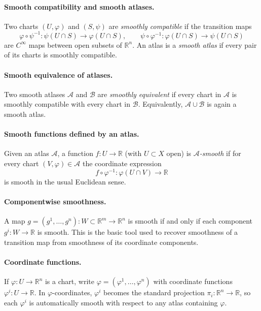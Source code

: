 \documentclass[12pt,a4paper]{article}
\theoremstyle{plain}
\theoremstyle{definition}      %
\begin{document}
\paragraph{Smooth compatibility and smooth atlases.}
Two charts $(U,\varphi)$ and $(S,\psi)$ are \emph{smoothly compatible} if the transition maps
\[
\varphi\circ \psi^{-1}:\psi(U\cap S)\to \varphi(U\cap S),
\qquad
\psi\circ \varphi^{-1}:\varphi(U\cap S)\to \psi(U\cap S)
\]
are $C^\infty$ maps between open subsets of $\mathbb R^n$.
An atlas is a \emph{smooth atlas} if every pair of its charts is smoothly compatible.

\paragraph{Smooth equivalence of atlases.}
Two smooth atlases $\mathcal A$ and $\mathcal B$ are \emph{smoothly equivalent} if every chart in $\mathcal A$
is smoothly compatible with every chart in $\mathcal B$.
Equivalently, $\mathcal A\cup\mathcal B$ is again a smooth atlas.

\paragraph{Smooth functions defined by an atlas.}
Given an atlas $\mathcal A$, a function $f:U\to\mathbb R$ (with $U\subset X$ open) is \emph{$\mathcal A$-smooth}
if for every chart $(V,\varphi)\in\mathcal A$ the coordinate expression
\[
f\circ \varphi^{-1}:\varphi(U\cap V)\to \mathbb R
\]
is smooth in the usual Euclidean sense.

\paragraph{Componentwise smoothness.}
A map $g=(g^1,\dots,g^n):W\subset\mathbb R^m\to\mathbb R^n$ is smooth if and only if each component
$g^i:W\to\mathbb R$ is smooth. This is the basic tool used to recover smoothness of a transition map from smoothness of
its coordinate components.

\paragraph{Coordinate functions.}
If $\varphi:U\to\mathbb R^n$ is a chart, write $\varphi=(\varphi^1,\dots,\varphi^n)$ with
coordinate functions $\varphi^i:U\to\mathbb R$.
In $\varphi$-coordinates, $\varphi^i$ becomes the standard projection $\pi_i:\mathbb R^n\to\mathbb R$,
so each $\varphi^i$ is automatically smooth with respect to any atlas containing $\varphi$.
\end{document}
